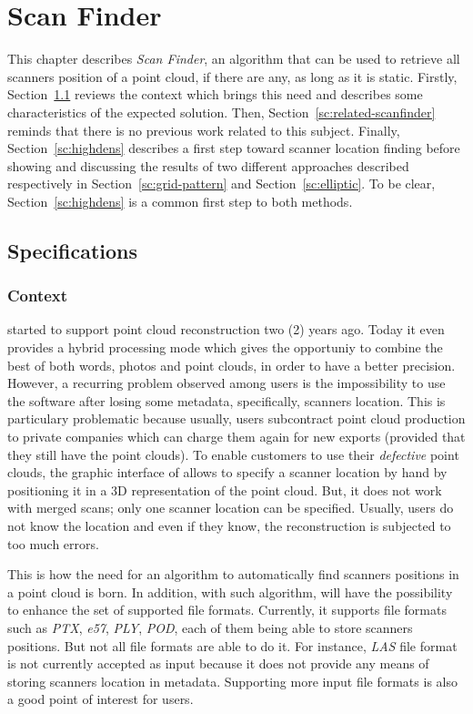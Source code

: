 \chapter{Scan Finder}
\label{ch:scanfinder}
This chapter describes \emph{Scan Finder}, an algorithm that can be used to retrieve all scanners position of a point cloud,  if there are any, as long as it is static. Firstly, Section~\ref{sc:spec-scanfinder} reviews the context which brings this need and describes some characteristics of the expected solution. Then, Section~\ref{sc:related-scanfinder} reminds that there is no previous work related to this subject. Finally, Section~\ref{sc:highdens} describes a first step toward scanner location
finding before showing and discussing the results of two different approaches described respectively in Section~\ref{sc:grid-pattern} and Section~\ref{sc:elliptic}. To be clear, Section~\ref{sc:highdens} is a common first step to both methods.



\section{Specifications}
\label{sc:spec-scanfinder}
\subsection{Context}
\CC started to support point cloud reconstruction two (2) years ago. Today it even provides a hybrid processing mode which gives the opportuniy to combine the best of both words, photos and point clouds, in order to have a better precision. However, a recurring problem observed among \CC users is the impossibility to use the software after losing some metadata, specifically, scanners location. This is particulary problematic because usually, \CC users subcontract point cloud production to private companies which can charge them again for new exports (provided that they still have the point clouds). To enable customers to use their \emph{defective} point clouds, the graphic interface of \CC allows to specify a scanner location by hand by positioning it in a 3D representation of the point cloud. But, it does not work with merged scans; only one scanner location can be specified. Usually, users do not know the location and even if they know, the reconstruction is subjected to too much errors.

This is how the need for an algorithm to automatically find scanners positions in a point cloud is born. In addition, with such algorithm, \CC will have the possibility to enhance the set of supported file formats. Currently, it supports file formats such as \emph{PTX}, \emph{e57}, \emph{PLY}, \emph{POD}, each of them being able to store scanners positions. But not all file formats are able to do it. For instance, \emph{LAS} file format is not currently accepted as input because it does not provide any means of storing scanners location in metadata. Supporting more input file formats is also a good point of interest for \CC users.

